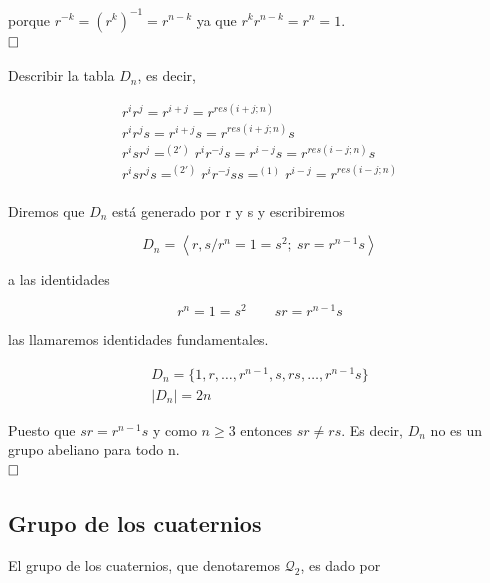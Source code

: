 \documentclass{article}
\begin{document}
porque $r^{-k}=(r^k)^{-1}=r^{n-k}$ ya que $r^kr^{n-k}=r^n=1$. \\

$\hfill\square$

Describir la tabla $D_n$, es decir,

\begin{gather*}
r^ir^j=r^{i+j}=r^{res(i+j;n)} \\
r^ir^js=r^{i+j}s=r^{res(i+j;n)}s \\
r^isr^j=^{(2')}r^ir^{-j}s=r^{i-j}s=r^{res(i-j;n)}s \\
r^isr^js=^{(2')}r^ir^{-j}ss=^{(1)}r^{i-j}=r^{res(i-j;n)} \\
\end{gather*}

Diremos que $D_n$ está generado por r y s y escribiremos

\[
D_n=\left\langle r,s/r^n=1=s^2;\: sr=r^{n-1}s \right\rangle
\]

a las identidades

\[
r^n=1=s^2 \qquad sr=r^{n-1}s
\]

las llamaremos identidades fundamentales.

\begin{gather*}
D_n=\{1,r,\ldots,r^{n-1},s,rs,\ldots,r^{n-1}s\} \\
|D_n|=2n 
\end{gather*}

Puesto que $sr=r^{n-1}s$ y como $n\geq 3$ entonces $sr\neq rs$. Es decir, $D_n$ no es un grupo abeliano para todo n. \\ 

$\hfill\square$

\subsection{Grupo de los cuaternios}

El grupo de los cuaternios, que denotaremos $\mathcal{Q}_2$, es dado por
\end{document}
